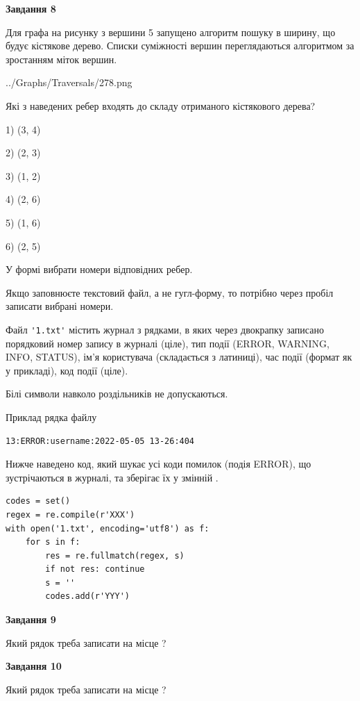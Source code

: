 \documentclass[12pt, ukrainian]{article}
\def\code#1{\Verb!#1!}
\begin{document}
{\begin {large}
{\begin {center}\textbf{Завдання 8}\end {center}}\par
Для графа на рисунку з вершини 5 запущено алгоритм пошуку в ширину, що будує кістякове дерево. Списки суміжності вершин переглядаються алгоритмом за зростанням міток вершин.\par
\begin{center}
	{../Graphs/Traversals/278.png}
\end{center}
\par Які з наведених ребер входять до складу отриманого кістякового дерева?\par
1) (3, 4)\par
2) (2, 3)\par
3) (1, 2)\par
4) (2, 6)\par
5) (1, 6)\par
6) (2, 5)\par
{\vskip 15pt} У формі вибрати номери відповідних ребер.


Якщо заповнюєте текстовий файл, а не гугл-форму, то потрібно через пробіл записа\-ти вибрані номери.\par
\newpage


Файл \code{'1.txt'} містить журнал з рядками, в яких через двокрапку записано поряд\-ко\-вий номер запису в журналі (ціле), тип події (ERROR, WARNING, INFO, STATUS), ім'я користувача (складається з латиниці), час події (фор\-мат як у прикладі), код події (ціле).

Білі символи навколо роздільників не допускаються.

Приклад рядка файлу



\begin{verbatim}
13:ERROR:username:2022-05-05 13-26:404
\end{verbatim}


Нижче наведено код, який шукає усі коди помилок (подія ERROR), що зустріча\-ють\-ся в журналі, та зберігає їх у змінній .



\begin{verbatim}
codes = set()
regex = re.compile(r'XXX')
with open('1.txt', encoding='utf8') as f:
    for s in f:
        res = re.fullmatch(regex, s)
        if not res: continue
        s = ''
        codes.add(r'YYY')
\end{verbatim}


{\begin {center}\textbf{Завдання 9}\end {center}}\par
Який рядок треба записати на місце  ?\par
\vspace{5mm}


{\begin {center}\textbf{Завдання 10}\end {center}}\par
Який рядок треба записати на місце  ?\par


\newpage


\end {large}}
\end{document}

